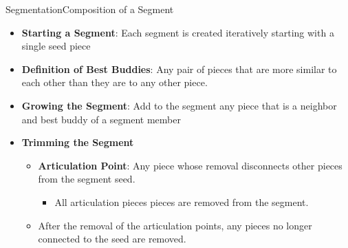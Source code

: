 \documentclass[10pt]{beamer}
\begin{document}
\begin{frame}{Segmentation}{Composition of a Segment}
  \begin{itemize}
    \setlength\itemsep{0.8em}
    \item \textbf{Starting a Segment}: Each segment is created iteratively starting with a single seed piece
    \vfill
    \item \textbf{Definition of {\color{spartanBlue} Best Buddies}}: Any pair of pieces that are more similar to each other than they are to any other piece.
    \vfill 
    \item \textbf{Growing the Segment}: Add to the segment any piece that is a neighbor and best buddy of a segment member
    \vfill
    \item \textbf{Trimming the Segment}
    \vspace{0.4em}
    \begin{itemize}
    \setlength\itemsep{0.8em}
	    \item \textbf{Articulation Point}: Any piece whose removal disconnects other pieces from the segment seed.
	    \vspace{0.4em}
	    \begin{itemize}
	      \item All articulation pieces pieces are removed from the segment.  
	    \end{itemize}
	    \item After the removal of the articulation points, any pieces no longer connected to the seed are removed.
    \end{itemize}
  \end{itemize}
\end{frame}
\end{document}
